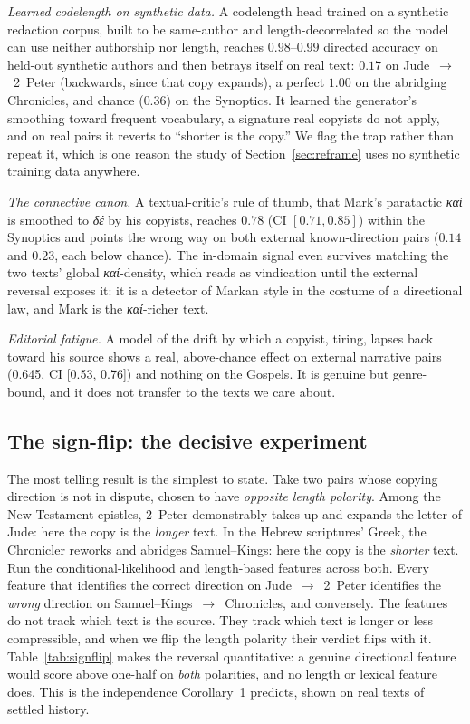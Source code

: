 \documentclass[11pt,letterpaper]{article}
\newcommand{\gk}[1]{{\greekfont\itshape #1}}
\begin{document}
\emph{Learned codelength on synthetic data.} A codelength head trained on a synthetic redaction corpus, built to be same-author and length-decorrelated so the model can use neither authorship nor length, reaches $0.98$--$0.99$ directed accuracy on held-out synthetic authors and then betrays itself on real text: $0.17$ on Jude~$\to$~2~Peter (backwards, since that copy expands), a perfect $1.00$ on the abridging Chronicles, and chance ($0.36$) on the Synoptics. It learned the generator's smoothing toward frequent vocabulary, a signature real copyists do not apply, and on real pairs it reverts to ``shorter is the copy.'' We flag the trap rather than repeat it, which is one reason the study of Section~\ref{sec:reframe} uses no synthetic training data anywhere.

\emph{The connective canon.} A textual-critic's rule of thumb, that Mark's paratactic \gk{καί} is smoothed to \gk{δέ} by his copyists, reaches $0.78$ (CI $[0.71, 0.85]$) within the Synoptics and points the wrong way on both external known-direction pairs ($0.14$ and $0.23$, each below chance). The in-domain signal even survives matching the two texts' global \gk{καί}-density, which reads as vindication until the external reversal exposes it: it is a detector of Markan style in the costume of a directional law, and Mark is the \gk{καί}-richer text.

\emph{Editorial fatigue.} A model of the drift by which a copyist, tiring, lapses back toward his source \citep{goodacre1998} shows a real, above-chance effect on external narrative pairs (0.645, CI [0.53, 0.76]) and nothing on the Gospels. It is genuine but genre-bound, and it does not transfer to the texts we care about.

\subsection{The sign-flip: the decisive experiment}

The most telling result is the simplest to state. Take two pairs whose copying direction is not in dispute, chosen to have \emph{opposite length polarity}. Among the New Testament epistles, 2~Peter demonstrably takes up and expands the letter of Jude: here the copy is the \emph{longer} text. In the Hebrew scriptures' Greek, the Chronicler reworks and abridges Samuel--Kings: here the copy is the \emph{shorter} text. Run the conditional-likelihood and length-based features across both. Every feature that identifies the correct direction on Jude~$\to$~2~Peter identifies the \emph{wrong} direction on Samuel--Kings~$\to$~Chronicles, and conversely. The features do not track which text is the source. They track which text is longer or less compressible, and when we flip the length polarity their verdict flips with it. Table~\ref{tab:signflip} makes the reversal quantitative: a genuine directional feature would score above one-half on \emph{both} polarities, and no length or lexical feature does. This is the independence Corollary~1 predicts, shown on real texts of settled history.
\end{document}
